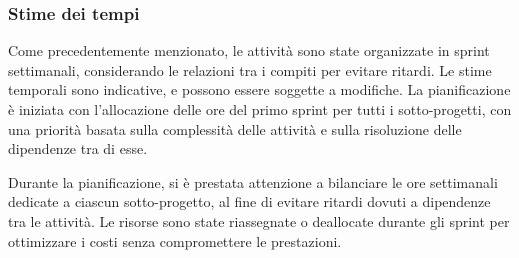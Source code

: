 \subsubsection{Stime dei tempi}
Come precedentemente menzionato, le attività sono state organizzate in sprint settimanali, considerando le relazioni tra i compiti per evitare ritardi. Le stime temporali sono indicative, e possono essere soggette a modifiche. La pianificazione è iniziata con l'allocazione delle ore del primo sprint per tutti i sotto-progetti, con una priorità basata sulla complessità delle attività e sulla risoluzione delle dipendenze tra di esse.

Durante la pianificazione, si è prestata attenzione a bilanciare le ore settimanali dedicate a ciascun sotto-progetto, al fine di evitare ritardi dovuti a dipendenze tra le attività. Le risorse sono state riassegnate o deallocate durante gli sprint per ottimizzare i costi senza compromettere le prestazioni.
